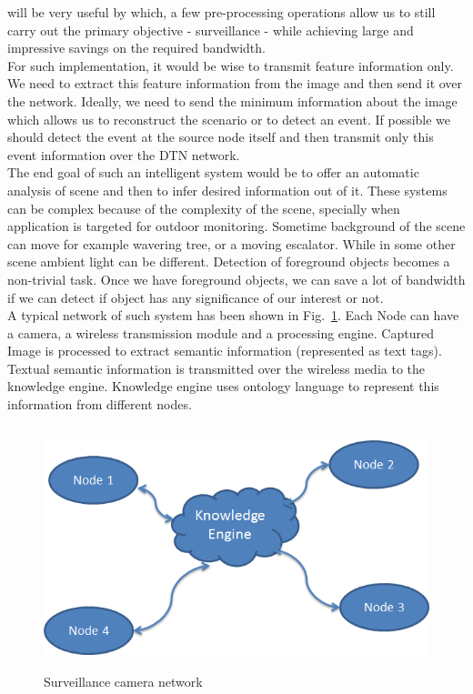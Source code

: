 will be very useful by which, a few pre-processing operations allow us to
still carry out the primary objective - surveillance - while achieving
large and impressive savings on the required bandwidth.\\
\indent For such implementation, it would be wise to transmit feature
information only. We need to extract this feature information from the
image and then send it over the network. Ideally, we need to send the
minimum information about the image which allows us to reconstruct the
scenario or to detect an event. If possible we should detect the
event at the source node itself and then transmit only this event
information over the DTN network.\\
\indent The end goal of such an intelligent system would be to offer an
automatic analysis of scene and then to infer desired information out of
it. These systems can be complex because of the complexity of the scene,
specially when application is targeted for outdoor monitoring. Sometime
background of the scene can move for example wavering tree, or a moving
escalator. While in some other scene ambient light can be different.
Detection of foreground objects becomes a non-trivial task. Once we have
foreground objects, we can save a lot of bandwidth if we can detect if
object has any significance of our interest or not.\\
\indent A typical network of such system has been shown in
Fig.~\ref{KE}. Each Node can have a camera, a wireless transmission
module and a processing engine. Captured Image is processed to extract
semantic information (represented as text tags). Textual semantic
information is transmitted over the wireless media to the knowledge
engine. Knowledge engine uses ontology language to represent this
information from different nodes.
\begin{figure}[!b]
\centering
\includegraphics[height=200pt]{Figures/KE}
\caption{Surveillance camera network}
\label{KE}
\end{figure}

